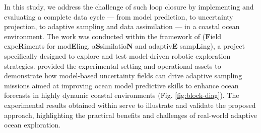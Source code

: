 In this study, we address the challenge of such loop closure by
implementing and evaluating a complete data cycle — from model
prediction, to uncertainty projection, to adaptive sampling and data
assimilation — in a coastal ocean environment. The work was conducted
within the framework of \proj (\textbf{F}ield expe\textbf{R}iments for
mod\textbf{E}ling, a\textbf{S}similatio\textbf{N} and
adaptiv\textbf{E} samp\textbf{L}ing), a project specifically designed
to explore and test model-driven robotic exploration strategies. \proj
provided the experimental setting and operational assets to
demonstrate how model-based uncertainty fields can drive adaptive
sampling missions aimed at improving ocean model predictive
skills %
to enhance ocean forecasts in highly dynamic coastal environments
(Fig. \ref{fig:block-diag}). The experimental results obtained within
\proj serve to illustrate and validate the proposed approach,
highlighting the practical benefits and challenges of real-world
adaptive ocean exploration.



